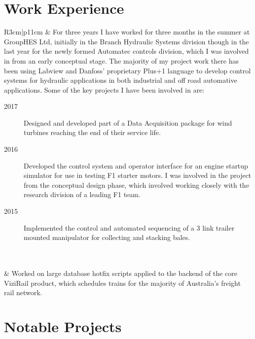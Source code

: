 \documentclass[10pt,a4paper]{article}
\def \rowdiv {\multicolumn{2}{c}{} \\}
\begin{document}
\section{Work Experience}
    \begin{tabular}{R{3cm}|p{11cm}}
            & For three years I have worked for three months in the summer at GroupHES Ltd, initially in the Branch Hydraulic Systems division though in the last year for the newly formed Automatec controls division, which I was involved in from an early conceptual stage. The majority of my project work there has been using Labview and Danfoss' proprietary Plus+1 language to develop control systems for hydraulic applications in both industrial and off road automative applications. Some of the key projects I have been involved in are:
            \begin{description}
                \item[2017] Designed and developed part of a Data Acquisition package for wind turbines reaching the end of their service life.
                \item[2016] Developed the control system and operator interface for an engine startup simulator for use in testing F1 starter motors. I was involved in the project from the conceptual design phase, which involved working closely with the research division of a leading F1 team. 
                \item[2015] Implemented the control and automated sequencing of a 3 link trailer mounted manipulator for collecting and stacking bales.
            \end{description} \\ \rowdiv
            & Worked on large database hotfix scripts applied to the backend of the core ViziRail product, which schedules trains for the majority of Australia's freight rail network. \\
    \end{tabular}

\section{Notable Projects}
\end{document}
